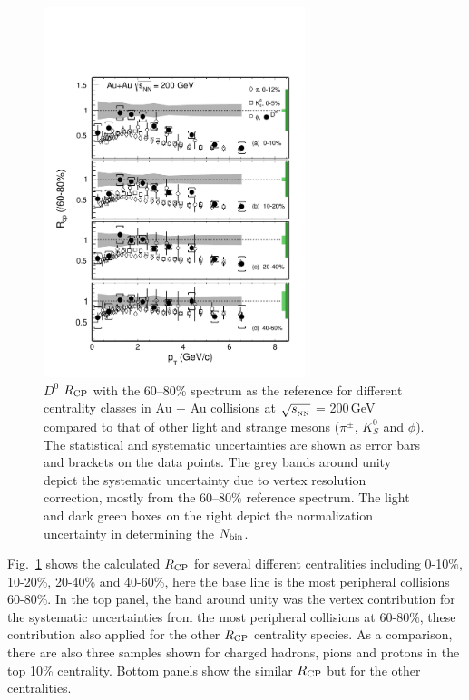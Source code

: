 \begin{figure}
\centering
\includegraphics[width=0.68\textwidth]{figure/Run14_D0HFT/D0_Rcp1.pdf}
\caption{$D^{0}$ $R_{\rm CP}$ with the 60--80\% spectrum as the reference for different centrality classes in Au + Au collisions at $\sqrt{s_{_{\rm NN}}}$ = 200\,GeV compared to that of other light and strange mesons ($\pi^{\pm}$, $K^0_{S}$ and $\phi$). The statistical and systematic uncertainties are shown as error bars and brackets on the data points. The grey bands around unity depict the systematic uncertainty due to vertex resolution correction, mostly from the 60--80\% reference spectrum. The light and dark green boxes on the right depict the normalization uncertainty in determining the $N_{\rm bin}$.}
\label{figure:D0_Rcp} 
\end{figure}

Fig.~\ref{figure:D0_Rcp} shows the calculated $R_{\rm CP}$ for several different centralities including 0-10\%, 10-20\%, 20-40\% and 40-60\%, here the base line is the most peripheral collisions 60-80\%. In the top panel, the band around unity was the vertex contribution for the systematic uncertainties from the most peripheral collisions at 60-80\%, these contribution also applied for the other $R_{\rm CP}$ centrality species. As a comparison, there are also three samples shown for charged hadrons, pions and protons in the top 10\% centrality. Bottom panels show the similar $R_{\rm CP}$ but for the other centralities.

